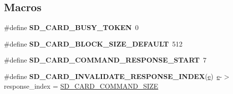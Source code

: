 \subsection*{Macros}
\begin{DoxyCompactItemize}
\item 
\mbox{\label{spi-sd-card_8c_a595ef4f0300d16f2fd5508c1ea032c32}} 
\#define {\bfseries S\+D\+\_\+\+C\+A\+R\+D\+\_\+\+B\+U\+S\+Y\+\_\+\+T\+O\+K\+EN}~0
\item 
\mbox{\label{spi-sd-card_8c_ad1d111c8496000af7212e66571206019}} 
\#define {\bfseries S\+D\+\_\+\+C\+A\+R\+D\+\_\+\+B\+L\+O\+C\+K\+\_\+\+S\+I\+Z\+E\+\_\+\+D\+E\+F\+A\+U\+LT}~512
\item 
\mbox{\label{spi-sd-card_8c_a007e080a11d944be3b3e5ec497dcb4c9}} 
\#define {\bfseries S\+D\+\_\+\+C\+A\+R\+D\+\_\+\+C\+O\+M\+M\+A\+N\+D\+\_\+\+R\+E\+S\+P\+O\+N\+S\+E\+\_\+\+S\+T\+A\+RT}~7
\item 
\mbox{\label{spi-sd-card_8c_accf53594352bde15cdbf07f7f35ff94c}} 
\#define {\bfseries S\+D\+\_\+\+C\+A\+R\+D\+\_\+\+I\+N\+V\+A\+L\+I\+D\+A\+T\+E\+\_\+\+R\+E\+S\+P\+O\+N\+S\+E\+\_\+\+I\+N\+D\+EX}(\mbox{\hyperlink{sun4u_2tte_8h_a8b0b9ed08e0e18920ec2682f48228c27}{e}})~\mbox{\hyperlink{sun4u_2tte_8h_a8b0b9ed08e0e18920ec2682f48228c27}{e}}-\/$>$response\+\_\+index = \mbox{\hyperlink{spi-sd-card_8h_add81282988892598d653b96979fb8991}{S\+D\+\_\+\+C\+A\+R\+D\+\_\+\+C\+O\+M\+M\+A\+N\+D\+\_\+\+S\+I\+ZE}}
\end{DoxyCompactItemize}
